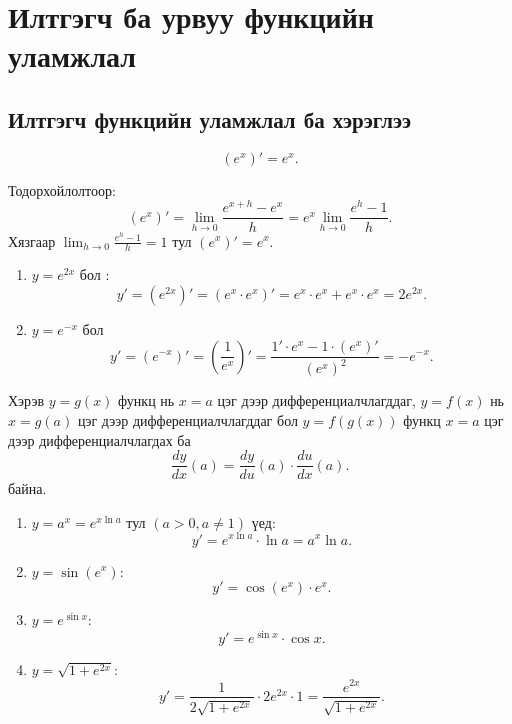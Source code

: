 \section{Илтгэгч ба урвуу функцийн уламжлал}

\subsection*{Илтгэгч функцийн уламжлал ба хэрэглээ}

\begin{theorem}
\[
(e^x)' = e^x.
\]
\end{theorem}

\begin{prof}
Тодорхойлолтоор:
\[
(e^x)' = \lim_{h\to 0} \frac{e^{x+h} - e^x}{h}
= e^x \lim_{h\to 0}\frac{e^h - 1}{h}.
\]
Хязгаар $\displaystyle \lim_{h\to 0}\frac{e^h - 1}{h}=1$ тул $(e^x)'=e^x$.
\end{prof}

\begin{example}
\begin{enumerate}
  \item $y=e^{2x}$ бол :
  \[
  y' = (e^{2x})'=(e^x\cdot e^x)'=e^x\cdot e^x+e^x\cdot e^x = 2e^{2x}.
  \]
  \item $y=e^{-x}$ бол
  \[
  y' = (e^{-x})'=\left(\dfrac{1}{e^x}\right)'=\dfrac{1'\cdot e^x-1\cdot (e^x)'}{(e^x)^2}= -e^{-x}.
  \]
\end{enumerate}
\end{example}
\begin{theorem}
Хэрэв $y=g(x)$ функц нь $x=a$ цэг дээр дифференциалчлагддаг, $y=f(x)$ нь $x=g(a)$ цэг дээр дифференциалчлагддаг бол $y=f(g(x))$ функц $x=a$ цэг дээр дифференциалчлагдах ба
\[
\boxed{\frac{dy}{dx}(a) = \frac{dy}{du}(a)\cdot\frac{du}{dx}(a)}.
\] байна.
\end{theorem}

\begin{example}
\begin{enumerate}
  \item $y=a^x=e^{x\ln a}$ тул $(a>0, a\ne1)$ үед:
  \[
  y' = e^{x\ln a}\cdot \ln a = a^x \ln a.
  \]
  \item $y=\sin(e^x)$:
  \[
  y' = \cos(e^x)\cdot e^x.
  \]
  \item $y=e^{\sin x}$:
  \[
  y' = e^{\sin x}\cdot \cos x.
  \]
  \item $y=\sqrt{1+e^{2x}}$:
  \[
  y'=\frac{1}{2\sqrt{1+e^{2x}}}\cdot 2e^{2x}\cdot 1
  =\frac{e^{2x}}{\sqrt{1+e^{2x}}}.
  \]
\end{enumerate}
\end{example}

